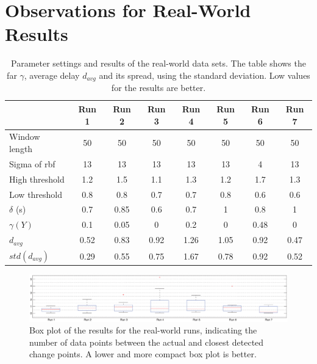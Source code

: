 
\chapter{Observations for Real-World Results} %

\label{AppendixA} %


\begin{table}
  \centering
  \caption[Results real world runs]{Parameter settings and results of the real-world data sets.
  The table shows the \gls{far} $\gamma$, average delay $d_{avg}$ and its spread, using the standard deviation.
  Low values for the results are better.}
  \begin{tabulary}{\textwidth}{|l|c|c|c|c|c|c|c|}
     & Run 1 & Run 2 & Run 3 & Run 4 & Run 5 & Run 6 & Run 7 \\
    \hline
    Window length & 50 & 50 & 50 & 50 & 50 & 50 & 50 \\
    \hline
    Sigma of \gls{rbf} & 13 & 13 & 13 & 13 & 13 & 4 & 13 \\
    \hline
    High threshold & 1.2 & 1.5 & 1.1 & 1.3 & 1.2 & 1.7 & 1.3 \\
    \hline
    Low threshold & 0.8 & 0.8 & 0.7 & 0.7 & 0.8 & 0.6 & 0.6 \\
    \hline
    $\delta$ (s) & 0.7 & 0.85 & 0.6 & 0.7 & 1 & 0.8 & 1 \\
    \hline
    \hline
    $\gamma(Y)$ & 0.1 & 0.05 & 0 & 0.2 & 0 & 0.48 & 0 \\
    \hline
    $d_{avg}$ & 0.52 & 0.83 & 0.92 & 1.26 & 1.05 & 0.92 & 0.47 \\
    \hline
    $std(d_{avg})$ & 0.29 & 0.55 & 0.75 & 1.67 & 0.78 & 0.92 & 0.52 \\
    \hline
  \end{tabulary}
  \label{tab:results_real_world}
\end{table}

\begin{figure}
\centering
  \includegraphics[width=1\textwidth]{./Figures/chapter6/data_collection/boxplot_results_real_world_runs.eps}
  \caption[Box plot results real-world runs individually optimized]{Box plot of the results for the real-world runs, indicating the number of data points between the actual and closest detected change points. A lower and more compact box plot is better.}
  \label{fig:boxplot_real_world_runs}
\end{figure}

